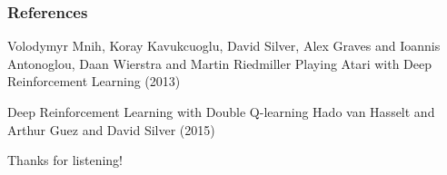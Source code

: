 \documentclass{beamer}
\begin{document}
\begin{frame}
\frametitle{References}
\footnotesize{
\begin{thebibliography}{99} %
 Volodymyr Mnih, Koray Kavukcuoglu, David Silver, Alex Graves and Ioannis Antonoglou, Daan Wierstra and Martin Riedmiller
\newblock Playing Atari with Deep Reinforcement Learning (2013)


 Deep Reinforcement Learning with Double Q-learning
\newblock Hado van Hasselt and Arthur Guez and David Silver (2015)
\end{thebibliography}
}
\end{frame}


\begin{frame}
\Huge{\centerline{Thanks for listening!}}
\end{frame}

\end{document}
